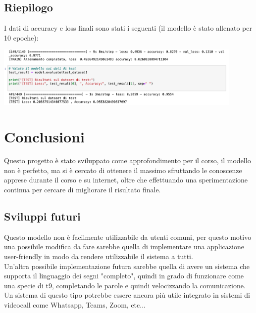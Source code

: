 \documentclass{article}
\begin{document}
\subsection{Riepilogo}
I dati di accuracy e loss finali sono stati i seguenti (il modello è stato allenato per 10 epoche):
\begin{center}
    \includegraphics[width=0.9\textwidth]{final_acc.png}
\end{center}

\newpage
\section{Conclusioni}
Questo progetto è stato sviluppato come approfondimento per il corso, il modello non è perfetto, ma si è cercato di ottenere il massimo sfruttando le conoscenze apprese durante il corso e su internet, oltre che effettuando una sperimentazione continua per cercare di migliorare il risultato finale.
 
\subsection{Sviluppi futuri}
Questo modello non è facilmente utilizzabile da utenti comuni, per questo motivo una possibile modifica da fare sarebbe quella di implementare una applicazione user-friendly in modo da rendere utilizzabile il sistema a tutti.\\
Un'altra possibile implementazione futura sarebbe quella di avere un sistema che supporta il linguaggio dei segni "completo", quindi in grado di funzionare come una specie di t9, completando le parole e quindi velocizzando la comunicazione. Un sistema di questo tipo potrebbe essere ancora più utile integrato in sistemi di videocall come Whatsapp, Teams, Zoom, etc...
\end{document}
